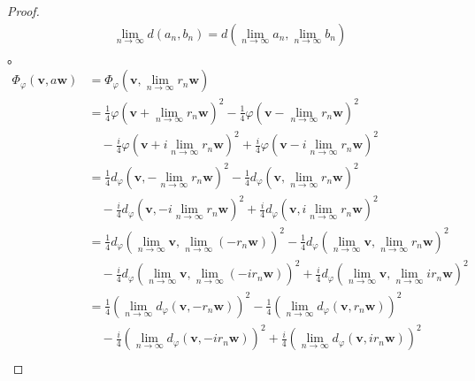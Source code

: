 \documentclass[dvipdfmx]{jsarticle}
\begin{document}
\begin{proof}
{\begin{align*}
\lim_{n \rightarrow \infty}{d\left( a_{n},b_{n} \right)} = d\left( \lim_{n \rightarrow \infty}a_{n},\lim_{n \rightarrow \infty}b_{n} \right)
\end{align*}}。
\begin{align*}
\varPhi_{\varphi}\left( \mathbf{v},a\mathbf{w} \right) &= \varPhi_{\varphi}\left( \mathbf{v},\lim_{n \rightarrow \infty}r_{n}\mathbf{w} \right)\\
&= \frac{1}{4}{\varphi\left( \mathbf{v} + \lim_{n \rightarrow \infty}r_{n}\mathbf{w} \right)}^{2} - \frac{1}{4}{\varphi\left( \mathbf{v} - \lim_{n \rightarrow \infty}r_{n}\mathbf{w} \right)}^{2} \\
&\quad - \frac{i}{4}{\varphi\left( \mathbf{v} + i\lim_{n \rightarrow \infty}r_{n}\mathbf{w} \right)}^{2} + \frac{i}{4}{\varphi\left( \mathbf{v} - i\lim_{n \rightarrow \infty}r_{n}\mathbf{w} \right)}^{2}\\
&= \frac{1}{4}{d_{\varphi}\left( \mathbf{v}, - \lim_{n \rightarrow \infty}r_{n}\mathbf{w} \right)}^{2} - \frac{1}{4}{d_{\varphi}\left( \mathbf{v},\lim_{n \rightarrow \infty}r_{n}\mathbf{w} \right)}^{2} \\
&\quad - \frac{i}{4}{d_{\varphi}\left( \mathbf{v}, - i\lim_{n \rightarrow \infty}r_{n}\mathbf{w} \right)}^{2} + \frac{i}{4}{d_{\varphi}\left( \mathbf{v},i\lim_{n \rightarrow \infty}r_{n}\mathbf{w} \right)}^{2}\\
&= \frac{1}{4}{d_{\varphi}\left( \lim_{n \rightarrow \infty}\mathbf{v},\lim_{n \rightarrow \infty}\left( - r_{n}\mathbf{w} \right) \right)}^{2} - \frac{1}{4}{d_{\varphi}\left( \lim_{n \rightarrow \infty}\mathbf{v},\lim_{n \rightarrow \infty}{r_{n}\mathbf{w}} \right)}^{2} \\
&\quad - \frac{i}{4}{d_{\varphi}\left( \lim_{n \rightarrow \infty}\mathbf{v},\lim_{n \rightarrow \infty}\left( - ir_{n}\mathbf{w} \right) \right)}^{2} + \frac{i}{4}{d_{\varphi}\left( \lim_{n \rightarrow \infty}\mathbf{v},\lim_{n \rightarrow \infty}{ir_{n}\mathbf{w}} \right)}^{2}\\
&= \frac{1}{4}\left( \lim_{n \rightarrow \infty}{d_{\varphi}\left( \mathbf{v}, - r_{n}\mathbf{w} \right)} \right)^{2} - \frac{1}{4}\left( \lim_{n \rightarrow \infty}{d_{\varphi}\left( \mathbf{v},r_{n}\mathbf{w} \right)} \right)^{2} \\
&\quad - \frac{i}{4}\left( \lim_{n \rightarrow \infty}{d_{\varphi}\left( \mathbf{v}, - ir_{n}\mathbf{w} \right)} \right)^{2} + \frac{i}{4}\left( \lim_{n \rightarrow \infty}{d_{\varphi}\left( \mathbf{v},ir_{n}\mathbf{w} \right)} \right)^{2}\\

\end{align*}
\end{proof}
\end{document}
